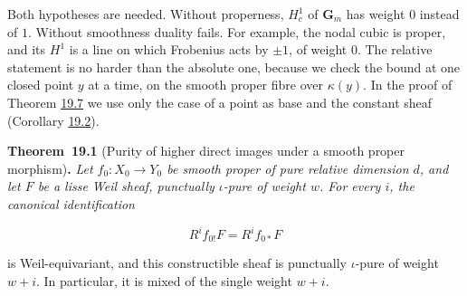 \documentclass[11pt]{article}
\newenvironment{bpstatement}[2]{\par\addvspace{0.6\baselineskip}\noindent\textbf{#1}#2\textbf{.}\enspace\ignorespaces}
  {\par\addvspace{0.4\baselineskip}}
\newenvironment{bpstatementit}[2]{\begin{bpstatement}{#1}{#2}\itshape\ignorespaces}{\end{bpstatement}}
\begin{document}
Both hypotheses are needed. Without properness, \(H^1_c\) of \(\mathbf G_m\) has weight \(0\) instead of \(1\). Without smoothness duality fails. For example, the nodal cubic is proper, and its \(H^1\) is a line on which Frobenius acts by \(\pm1\), of weight \(0\). The relative statement is no harder than the absolute one, because we check the bound at one closed point \(y\) at a time, on the smooth proper fibre over \(\kappa(y)\). In the proof of Theorem \hyperref[bp24]{19.7} we use only the case of a point as base and the constant sheaf (Corollary \hyperref[bp8]{19.2}).

\label{bp5}%
\begin{bpstatementit}{Theorem~19.1}{ (Purity of higher direct images under a smooth proper morphism)}
Let \(f_0:X_0\to Y_0\) be smooth proper of pure relative dimension \(d\), and let \(F\) be a lisse Weil sheaf, punctually \(\iota\)-pure of weight \(w\). For every \(i\), the canonical identification

\[
R^if_{0!}F=R^if_{0*}F
\]

is Weil-equivariant, and this constructible sheaf is punctually \(\iota\)-pure of weight \(w+i\). In particular, it is mixed of the single weight \(w+i\).
\end{bpstatementit}
\end{document}
